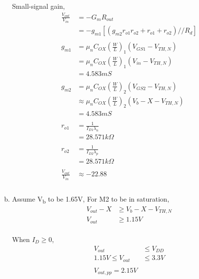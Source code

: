 \documentclass{article}
\begin{document}
\begin{enumerate}[(a)]
Small-signal gain,
\begin{equation*}
\begin{aligned}
\frac{V_{out}}{V_{in}} &= -G_{m}R_{out} \\
&= -g_{m1}[(g_{m2}r_{o1}r_{o2} + r_{o1} + r_{o2}) // R_{d}] \\
\\
g_{m1} &= \mu_{n}C_{OX} (\frac{W}{L})_{1} (V_{GS1} - V_{TH,N}) \\
&= \mu_{n}C_{OX} (\frac{W}{L})_{1} (V_{in} - V_{TH,N}) \\
&= 4.583 mS \\
\\
g_{m2} &= \mu_{n}C_{OX} (\frac{W}{L})_{2} (V_{GS2} - V_{TH,N}) \\
&\approx \mu_{n}C_{OX} (\frac{W}{L})_{2} (V_{b} - X - V_{TH,N}) \\
&= 4.583 mS \\
\\
r_{o1} &= \frac{1}{I_{D1}\lambda_{n}} \\
&= 28.571 k\Omega \\
\\
r_{o2} &= \frac{1}{I_{D2}\lambda_{p}} \\
&= 28.571 k\Omega \\
\\
\frac{V_{out}}{V_{in}} &\approx -22.88 \\
\\
\end{aligned}
\end{equation*}

\item Assume V\textsubscript{b} to be 1.65V,
For M2 to be in saturation,
\begin{equation*}
\begin{aligned}
V_{out} - X &\geq V_{b} - X - V_{TH,N} \\
V_{out} &\geq 1.15 V \\
\end{aligned}
\end{equation*}

When \(I_{D} \geq 0\),
\begin{equation*}
\begin{aligned}
V_{out} &\leq V_{DD} \\
1.15 V \leq V_{out} &\leq 3.3V \\
\\
V_{out,pp} = 2.15V
\end{aligned}
\end{equation*}


\end{enumerate}
\end{document}
